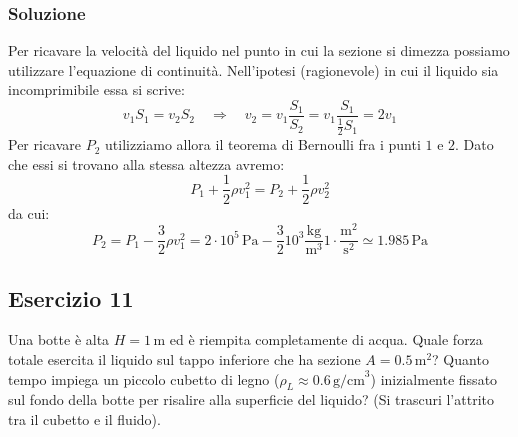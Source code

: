 \documentclass[12pt,a4paper]{book}
\begin{document}
\subsubsection*{Soluzione}
Per ricavare la velocità del liquido nel punto in cui la sezione si dimezza possiamo utilizzare l'equazione di continuità. 
Nell'ipotesi (ragionevole) in cui il liquido sia incomprimibile essa si scrive:
\begin{equation*}
v_1 S_1 =v_2 S_2 \quad \Rightarrow \quad v_2=v_1 \frac{S_1}{S_2}=v_1 \frac{S_1}{\frac{1}{2}S_1}=2v_1
\end{equation*}
Per ricavare $P_2$ utilizziamo allora il teorema di Bernoulli fra i punti $1$ e $2$. Dato che essi si trovano alla stessa altezza avremo:
\begin{equation*}
P_1+ \frac{1}{2} \rho v_1^2=P_2  + \frac{1}{2} \rho v_2^2
\end{equation*}
da cui:
\begin{equation*}
P_2=P_1 -\frac{3}{2} \rho v_1^2 =2\cdot 10^5 \, \text{Pa}  -\frac{3}{2} 10^3 \frac{\text{kg}}{\text{m}^3}  1 \cdot \frac{\text{m}^2}{\text{s}^2} \simeq 1.985 \, \text{Pa}
\end{equation*}

\subsection*{Esercizio 11}
Una botte è alta $H=1 \,$m ed è riempita completamente di acqua. Quale forza totale esercita il liquido sul tappo inferiore che ha sezione $A=0.5\,$m$^2$? Quanto tempo impiega un piccolo cubetto di legno ($\rho_L \approx 0.6 \, \text{g/cm}^3$) inizialmente fissato sul fondo della botte per risalire alla superficie del liquido? (Si trascuri l'attrito tra il cubetto e il fluido).
\end{document}
